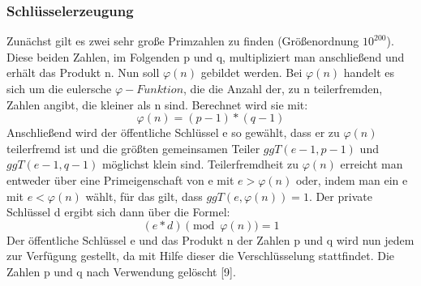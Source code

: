 \documentclass[conference,10pt,a4paper,twocolumn]{IEEEtran}
\begin{document}
\subsubsection{Schlüsselerzeugung}
Zunächst gilt es zwei sehr große Primzahlen zu finden (Größenordnung \begin{math}10^{200}\end{math}). Diese beiden Zahlen, im Folgenden p und q, multipliziert man anschließend und erhält das Produkt n. Nun soll \begin{math}\varphi (n) \end{math} gebildet werden.
Bei \begin{math}\varphi (n) \end{math} handelt es sich um die eulersche \begin{math}\varphi -Funktion \end{math}, die die Anzahl der, zu n teilerfremden, Zahlen angibt, die kleiner als n sind. Berechnet wird sie mit: \linebreak 
\begin{equation}
\varphi (n) = (p - 1) * (q - 1)
\end{equation}
Anschließend wird der öffentliche Schlüssel e so gewählt, dass er zu \begin{math}\varphi (n) \end{math} teilerfremd ist und  die größten gemeinsamen Teiler \begin{math}ggT(e-1, p-1) \end{math} und \begin{math}ggT(e-1, q-1) \end{math} möglichst klein sind.
Teilerfremdheit zu \begin{math}\varphi (n) \end{math} erreicht man entweder über eine Primeigenschaft von e mit \begin{math}e > \varphi (n) \end{math} oder, indem man ein e mit  \begin{math}e < \varphi (n) \end{math} wählt, für das gilt, dass \begin{math}ggT(e, \varphi (n)) = 1 \end{math}.
Der private Schlüssel d ergibt sich dann über die Formel:
\begin{equation}
(e*d) \pmod{\varphi(n)} = 1
\end{equation}
Der öffentliche Schlüssel e und das Produkt n der Zahlen p und q wird nun jedem zur Verfügung gestellt, da mit Hilfe dieser die Verschlüsselung stattfindet. Die Zahlen p und q nach Verwendung gelöscht [9].
\end{document}
